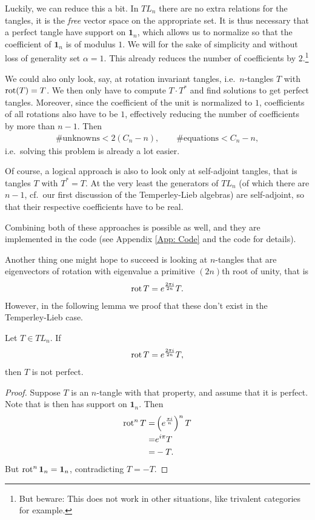 \bigno Luckily, we can reduce this a bit. In $TL_n$ there are no extra relations for the tangles, it is the \emph{free} vector space on the appropriate set. It is thus necessary that a perfect tangle have support on $\mathbf{1}_n$, which allows us to normalize so that the coefficient of $\mathbf{1}_n$ is of modulus $1$. We will for the sake of simplicity and without loss of generality set $\alpha=1$. This already reduces the number of coefficients by $2$.\footnote{But beware: This does not work in other situations, like trivalent categories for example.}

 We could also only look, say, at rotation invariant tangles, i.e.\ $n$-tangles $T$ with $\operatorname{rot}(T)=T$. We then only have to compute $T\cdot T^*$ and find solutions to get perfect tangles. Moreover, since the coefficient of the unit is normalized to $1$, coefficients of all rotations also have to be $1$, effectively reducing the number of coefficients by more than $n-1$. Then
 \begin{align*}
 \# \text{unknowns} < 2(C_n - n), \qquad  \# \text{equations}  < C_n - n,
 \end{align*}
 i.e.\ solving this problem is already a lot easier.
 
Of course, a logical approach is also to look only at self-adjoint tangles, that is tangles $T$ with $T^* = T$. At the very least the generators of $TL_n$ (of which there are $n-1$, cf.\ our first discussion of the Temperley-Lieb algebras) are self-adjoint, so that their respective coefficients have to be real.

Combining both of these approaches is possible as well, and they are implemented in the code (see \textsf{Appendix \ref{App: Code}} and the code for details).

\bigno Another thing one might hope to succeed is looking at $n$-tangles that are eigenvectors of rotation with eigenvalue a primitive $(2n)$th root of unity, that is
\begin{align*}
\operatorname{rot} T  = e^{\frac{2\pi i}{2n}}T.
\end{align*}
However, in the following lemma we proof that these don't exist in the Temperley-Lieb case.

\begin{lemma}
Let $T\in TL_n$. If
\begin{align*}
\operatorname{rot}  T  = e^{\frac{2\pi i}{2n}}T,
\end{align*}
then $T$ is not perfect.
\begin{proof}
Suppose $T$ is an $n$-tangle with that property, and assume that it is perfect. Note that is then has support on $\mathbf{1}_n$. Then
\begin{align*}
\operatorname{rot}^n T =& \left( e^{\frac{\pi i}{n}} \right)^n T \\
=& e^{i\pi} T \\
=& -T.
\end{align*}
But $\operatorname{rot}^n \mathbf{1}_n = \mathbf{1}_n$,  contradicting $T = -T$.
\end{proof}
\end{lemma}

